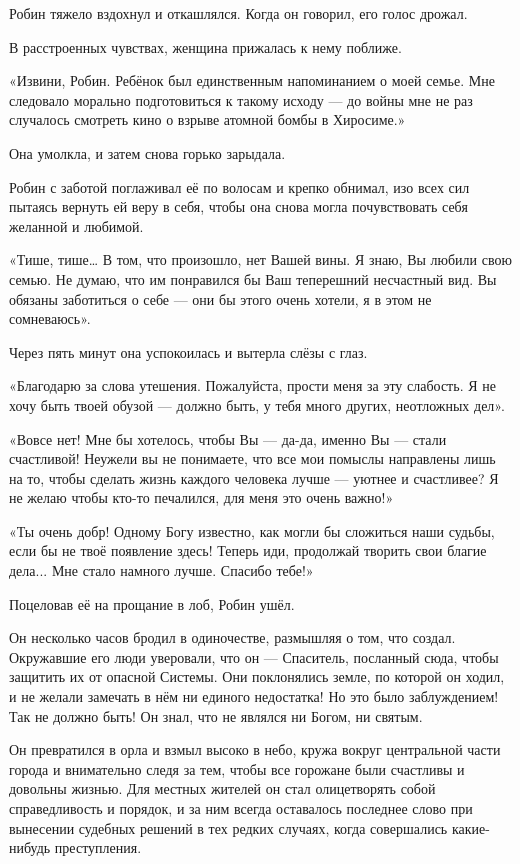 \documentclass[a4paper,12pt]{book}
\begin{document}
\par
Робин тяжело вздохнул и откашлялся. Когда он говорил, его голос дрожал.
\par
В расстроенных чувствах, женщина прижалась к нему поближе.
\par
«Извини, Робин. Ребёнок был единственным напоминанием о моей семье. Мне следовало морально подготовиться к такому исходу — до войны мне не раз случалось смотреть кино о взрыве атомной бомбы в Хиросиме.»
\par
Она умолкла, и затем снова горько зарыдала.
\par
Робин с заботой поглаживал её по волосам и крепко обнимал, изо всех сил пытаясь вернуть ей веру в себя, чтобы она снова могла почувствовать себя желанной и любимой.
\par
«Тише, тише… В том, что произошло, нет Вашей вины. Я знаю, Вы любили свою семью. Не думаю, что им понравился бы Ваш теперешний несчастный вид. Вы обязаны заботиться о себе — они бы этого очень хотели, я в этом не сомневаюсь».
\par
Через пять минут она успокоилась и вытерла слёзы с глаз.
\par
«Благодарю за слова утешения. Пожалуйста, прости меня за эту слабость. Я не хочу быть твоей обузой — должно быть, у тебя много других, неотложных дел».
\par
«Вовсе нет! Мне бы хотелось, чтобы Вы — да-да, именно Вы — стали счастливой! Неужели вы не понимаете, что все мои помыслы направлены лишь на то, чтобы сделать жизнь каждого человека лучше — уютнее и счастливее? Я не желаю чтобы кто-то печалился, для меня это очень важно!»
\par
«Ты очень добр! Одному Богу известно, как могли бы сложиться наши судьбы, если бы не твоё появление здесь! Теперь иди, продолжай творить свои благие дела... Мне стало намного лучше. Спасибо тебе!»
\par
Поцеловав её на прощание в лоб, Робин ушёл.
\par
Он несколько часов бродил в одиночестве, размышляя о том, что создал. Окружавшие его люди уверовали, что он — Спаситель, посланный сюда, чтобы защитить их от опасной Системы. Они поклонялись земле, по которой он ходил, и не желали замечать в нём ни единого недостатка! Но это было заблуждением! Так не должно быть! Он знал, что не являлся ни Богом, ни святым.\\
\par
Он превратился в орла и взмыл высоко в небо, кружа вокруг центральной части города и внимательно следя за тем, чтобы все горожане были счастливы и довольны жизнью. Для местных жителей он стал олицетворять собой справедливость и порядок, и за ним всегда оставалось последнее слово при вынесении судебных решений в тех редких случаях, когда совершались какие-нибудь преступления.\\
\end{document}
